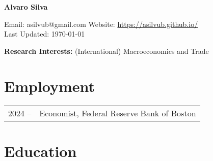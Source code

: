 \documentclass[10pt]{article}
\begin{document}
\begin{center}
\begin{Large} \bfseries Alvaro Silva\end{Large} 
\end{center}


\vspace*{0.2in}
\noindent Email: asilvub@gmail.com \hfill Website: \href{https://asilvub.github.io/}{https://asilvub.github.io/} \\
Last Updated: \today\\

\vspace*{-0.1in}


\noindent \textbf{\normalsize Research Interests: } (International) Macroeconomics and Trade

\section*{Employment}
\begin{tabular}{@{}p{1.8cm}p{13cm}}
    2024 -- & Economist, Federal Reserve Bank of Boston
\end{tabular}

\section*{Education}
%
\end{document}
